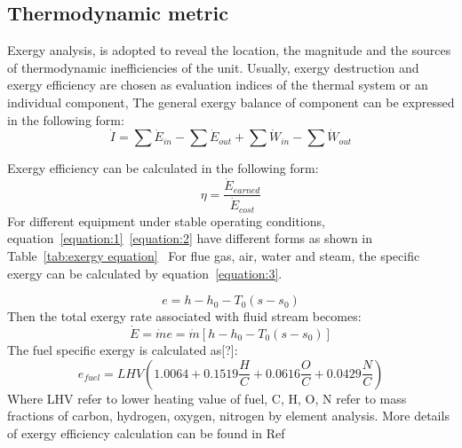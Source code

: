 \documentclass[preprint,12pt]{elsarticle}
\begin{document}
\subsection{Thermodynamic metric} %
\label{ssub3:analsys method} 
Exergy analysis, is adopted to reveal the location, the magnitude and the sources of thermodynamic inefficiencies of the unit.
Usually, exergy destruction and exergy efficiency are chosen as evaluation indices of the thermal system or an individual component, 
The general exergy balance of component can be expressed in the following form:
\begin{equation}
\label{equation:1}
\dot{I}=\sum\dot{E}{}_{in}-\sum\dot{E}{}_{out}+\sum\dot{W}{}_{in}-\sum\dot{W}{}_{out}
\end{equation}
%

%

%



Exergy efficiency can be calculated in the following form:
\begin{equation}
\label{equation:2}
\eta=\frac{\dot{E}{}_{earned}}{\dot{E}{}_{cost}}
\end{equation}
For different equipment under stable operating conditions, equation~\ref{equation:1}~\ref{equation:2} have different forms as shown in Table~\ref{tab:exergy equation}~\cite{Aljundi2009Energy}
For flue gas, air, water and steam, the specific exergy can be calculated by equation~\ref{equation:3}.

\begin{equation}{}
\label{equation:3}
e=h-h_{0}-T_{0}\left(s-s_{0}\right)
\end{equation}
Then the total exergy rate associated with ﬂuid stream becomes:
\begin{equation}
\dot{E}=\dot{m}e=\dot{m}\left[h-h_{0}-T_{0}\left(s-s_{0}\right)\right]{}
\end{equation}
The fuel speciﬁc exergy is calculated as[?]: 
\begin{equation}
e_{fuel}=LHV\left(1.0064+0.1519\frac{H}{C}+0.0616\frac{O}{C}+0.0429\frac{N}{C}\right)
\end{equation}
Where LHV refer to lower heating value of fuel, C, H, O, N refer to mass fractions of carbon, hydrogen, oxygen, nitrogen by element analysis.
More details of exergy  efficiency calculation can be found in Ref~\cite{G2016Exergy}
\end{document}
